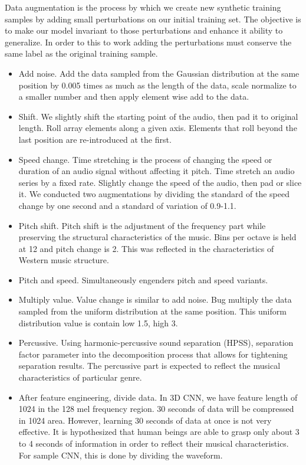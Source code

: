\documentclass[journal]{IEEEtran}
\begin{document}
Data augmentation is the process by which we create new synthetic training samples by adding small perturbations on our initial training set.
The objective is to make our model invariant to those perturbations and enhance it ability to generalize.
In order to this to work adding the perturbations must conserve the same label as the original training sample.

\begin{itemize}
	\item Add noise. 
	Add the data sampled from the Gaussian distribution at the same position by 0.005 times as much as the length of the data, scale normalize to a smaller number and then apply element wise add to the data.
	
	\item Shift. We slightly shift the starting point of the audio, then pad it to original length.
	Roll array elements along a given axis.
	Elements that roll beyond the last position are re-introduced at the first.
	
	\item Speed change. 
	Time stretching is the process of changing the speed or duration of an audio signal without affecting it pitch.
	Time stretch an audio series by a fixed rate.
	Slightly change the speed of the audio, then pad or slice it.
	We conducted two augmentations by dividing the standard of the speed change by one second and a standard of variation of 0.9-1.1.
	
	\item  Pitch shift.
	Pitch shift is the adjustment of the frequency part while preserving the structural characteristics of the music.
	Bins per octave is held at 12 and pitch change is 2.
	This was reflected in the characteristics of Western music structure.
	
	\item Pitch and speed.
	Simultaneously engenders pitch and speed variants.
	
	\item Multiply value.
	Value change is similar to add noise.
	Bug multiply the data sampled from the uniform distribution at the same position.
	This uniform distribution value is contain low 1.5, high 3.
	
	\item Percussive.
	Using harmonic-percussive sound separation (HPSS), separation factor parameter into the decomposition process that allows for tightening separation results.
	The percussive part is expected to reflect the musical characteristics of particular genre.
	
	\item After feature engineering, divide data.
	In 3D CNN, we have feature length of 1024 in the 128 mel frequency region.
	30 seconds of data will be compressed in 1024 area.
	However, learning 30 seconds of data at once is not very effective.
	It is hypothesized that human beings are able to grasp only about 3 to 4 seconds of information in order to reflect their musical characteristics.
	For sample CNN, this is done by dividing the waveform.
\end{itemize}
\end{document}
